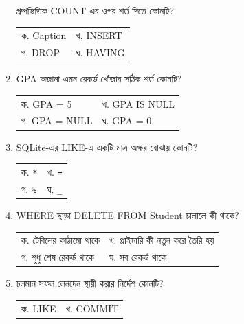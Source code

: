 \begin{multicols}{2}
\begin{enumerate}[resume]
\begin{minipage}[t]{\linewidth}
গ্রুপভিত্তিক COUNT-এর ওপর শর্ত দিতে কোনটি?
\par
\begin{tabularx}{\linewidth}{@{}X X@{}}
ক. Caption & খ. INSERT \\
গ. DROP & ঘ. HAVING \\
\end{tabularx}
\end{minipage}
\vspace{1pt}
\item \begin{minipage}[t]{\linewidth}
GPA অজানা এমন রেকর্ড খোঁজার সঠিক শর্ত কোনটি?
\par
\begin{tabularx}{\linewidth}{@{}X X@{}}
ক. GPA = 5 & খ. GPA IS NULL \\
গ. GPA = NULL & ঘ. GPA = 0 \\
\end{tabularx}
\end{minipage}
\vspace{1pt}
\item \begin{minipage}[t]{\linewidth}
SQLite-এর LIKE-এ একটি মাত্র অক্ষর বোঝায় কোনটি?
\par
\begin{tabularx}{\linewidth}{@{}X X@{}}
ক. \texttt{*} & খ. \texttt{=} \\
গ. \texttt{\%} & ঘ. \texttt{\_} \\
\end{tabularx}
\end{minipage}
\vspace{1pt}
\item \begin{minipage}[t]{\linewidth}
WHERE ছাড়া DELETE FROM Student চালালে কী থাকে?
\par
\begin{tabularx}{\linewidth}{@{}X X@{}}
ক. টেবিলের কাঠামো থাকে & খ. প্রাইমারি কী নতুন করে তৈরি হয় \\
গ. শুধু শেষ রেকর্ড থাকে & ঘ. সব রেকর্ড থাকে \\
\end{tabularx}
\end{minipage}
\vspace{1pt}
\item \begin{minipage}[t]{\linewidth}
চলমান সফল লেনদেন স্থায়ী করার নির্দেশ কোনটি?
\par
\begin{tabularx}{\linewidth}{@{}X X@{}}
ক. LIKE & খ. COMMIT \\

\end{tabularx}
\end{minipage}
\end{enumerate}
\end{multicols}
